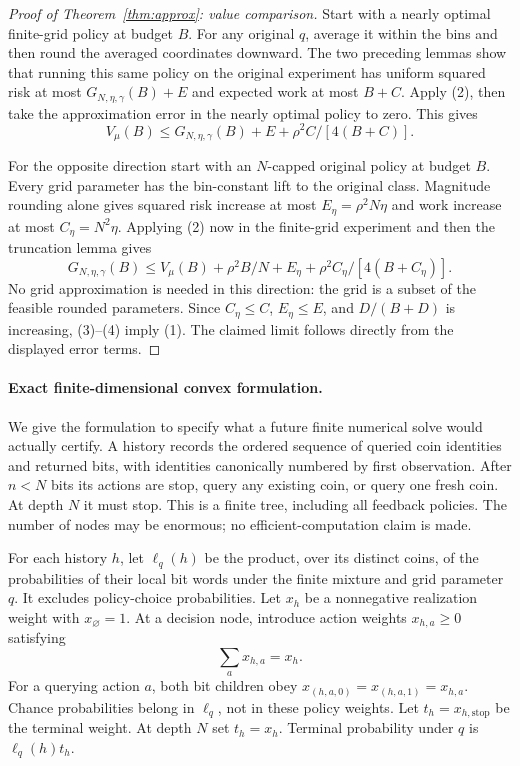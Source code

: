 \begin{proof}[Proof of Theorem~\ref{thm:approx}: value comparison]
Start with a nearly optimal finite-grid policy at budget $B$. For any
original $q$, average it within the bins and then round the averaged
coordinates downward. The two preceding lemmas show that running this same
policy on the original experiment has uniform squared risk at most
$G_{N,\eta,\gamma}(B)+E$ and expected work at most $B+C$. Apply (2), then
take the approximation error in the nearly optimal policy to zero. This gives
\[
 V_\mu(B)\le G_{N,\eta,\gamma}(B)+E+
                         \rho^2C/[4(B+C)].                \tag{3}
\]

For the opposite direction start with an $N$-capped original policy at
budget $B$. Every grid parameter has the bin-constant lift to the original
class. Magnitude rounding alone gives squared risk increase at most
$E_\eta=\rho^2N\eta$ and work increase at most $C_\eta=N^2\eta$.
Applying (2) now in the finite-grid experiment and then the truncation lemma
gives
\[
 G_{N,\eta,\gamma}(B)
 \le V_\mu(B)+\rho^2B/N+E_\eta+
                         \rho^2 C_\eta/[4(B+C_\eta)].      \tag{4}
\]
No grid approximation is needed in this direction: the grid is a subset of
the feasible rounded parameters. Since $C_\eta\le C$, $E_\eta\le E$, and
$D/(B+D)$ is increasing, (3)--(4) imply (1). The claimed limit follows
directly from the displayed error terms.
\end{proof}

\paragraph{Exact finite-dimensional convex formulation.}
We give the formulation to specify what a future finite numerical solve
would actually certify. A history records the ordered sequence of queried
coin identities and returned bits, with identities canonically numbered by
first observation. After $n<N$ bits its actions are stop, query any existing
coin, or query one fresh coin. At depth $N$ it must stop. This is a finite
tree, including all feedback policies. The number of nodes may be enormous;
no efficient-computation claim is made.

For each history $h$, let $\ell_q(h)$ be the product, over its distinct coins,
of the probabilities of their local bit words under the finite mixture and
grid parameter $q$. It excludes policy-choice probabilities. Let $x_h$ be a
nonnegative realization weight with $x_\varnothing=1$. At a decision node,
introduce action weights $x_{h,a}\ge0$ satisfying
\[
 \sum_a x_{h,a}=x_h.
\]
For a querying action $a$, both bit children obey
$x_{(h,a,0)}=x_{(h,a,1)}=x_{h,a}$. Chance probabilities belong in
$\ell_q$, not in these policy weights. Let $t_h=x_{h,\mathrm{stop}}$ be
the terminal weight. At depth $N$ set $t_h=x_h$. Terminal probability under
$q$ is $\ell_q(h)t_h$.

